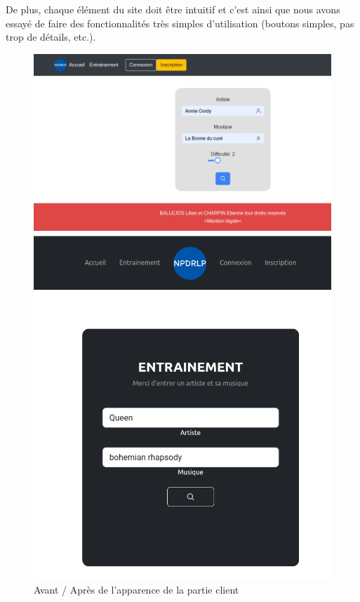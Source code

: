 \documentclass[12pt,french]{article}
\begin{document}
De plus, chaque élément du site doit être intuitif et c'est ainsi que nous avons essayé de faire des fonctionnalités très simples d'utilisation (boutons simples, pas trop de détails, etc.).

\begin{figure}[H]
	\centering
	\begin{minipage}{.5\textwidth}
		\centering
		\includegraphics[scale=0.25]{avantfront.png}
	\end{minipage}%
	\begin{minipage}{.5\textwidth}
		\centering
		\includegraphics[scale=0.25]{apresfront.png}
	\end{minipage}
	\caption{Avant / Après de l'apparence de la partie client}
\end{figure}
\end{document}
